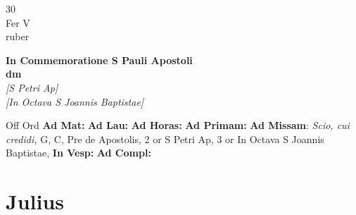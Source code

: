 \documentclass[10pt, openany]{book}
\begin{document}
        \begin{center}
            \begin{minipage}{3.5in}
                \vspace{2em}
                \begin{minipage}{0.5in}
                    {\Huge 30} \\
                    {\normalsize Fer V} \\
                    {\normalsize ruber}
                \end{minipage}
                \begin{minipage}{3.0in}
                    \textbf{ \large In Commemoratione S Pauli Apostoli \\
                    \textnormal{\normalsize dm}} \\ \textit{[S Petri Ap]} \\ \textit{[In Octava S Joannis Baptistae]} \\ 
                \end{minipage}
                \begin{justify}Off Ord
                    \textbf{Ad Mat: }
                    \textbf{Ad Lau: }
                    \textbf{Ad Horas: }
                    \textbf{Ad Primam: }\textbf{Ad Missam}: \textit{Scio, cui credidi,} G, C, Pre de Apostolis, 2 or S Petri Ap, 3 or In Octava S Joannis Baptistae,  
                    \textbf{In Vesp: }
                    \textbf{Ad Compl: }
                \end{justify}
            \end{minipage}
        \end{center}
    
        \chapter{Julius}
                        
\end{document}
